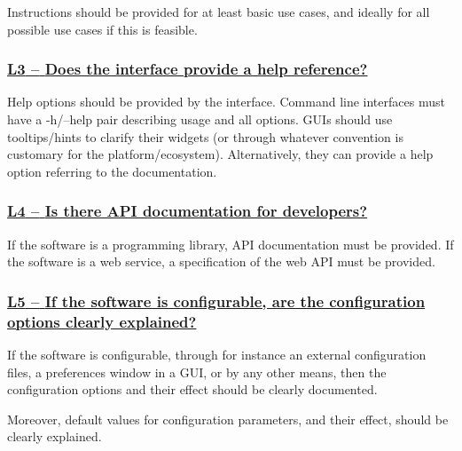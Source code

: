 \documentclass[a4paper,11pt]{article}
\newcommand{\indicator}[1]{\subsubsection*{\underline{#1}}}
\begin{document}
Instructions should be provided for at least basic use cases, and ideally for
all possible use cases if this is feasible.

%
%
%

\newcommand{\lThreeName}{L3}
\newcommand{\lThreeID}{\lThreeName}
\newcommand{\lThreeText}{Does the interface provide a help reference?}
\indicator{\lThreeName{ }--{ }\lThreeText}\label{id:l3} 

Help options should be provided by the interface. Command line interfaces must
have a -h/--help pair describing usage and all options. GUIs should use tooltips/hints to clarify
their widgets (or through whatever convention is customary for the
platform/ecosystem). Alternatively, they can provide a help option referring to
the documentation.

\newcommand{\lFourName}{L4}
\newcommand{\lFourID}{\lFourName}
\newcommand{\lFourText}{Is there API documentation for developers?}
\indicator{\lFourName{ }--{ }\lFourText}\label{id:l4} 

If the software is a programming library, API documentation must be provided.
If the software is a web service, a specification of the web API must be provided.

\newcommand{\lFiveName}{L5}
\newcommand{\lFiveID}{\lFiveName}
\newcommand{\lFiveText}{If the software is configurable, are the configuration options clearly explained?}
\indicator{\lFiveName{ }--{ }\lFiveText}\label{id:l5} 

%
%

If the software is configurable, through for instance an external configuration
files, a preferences window in a GUI, or by any other means, then the
configuration options and their effect should be clearly documented.

Moreover, default values for configuration parameters, and their effect, should be
clearly explained.
\end{document}
